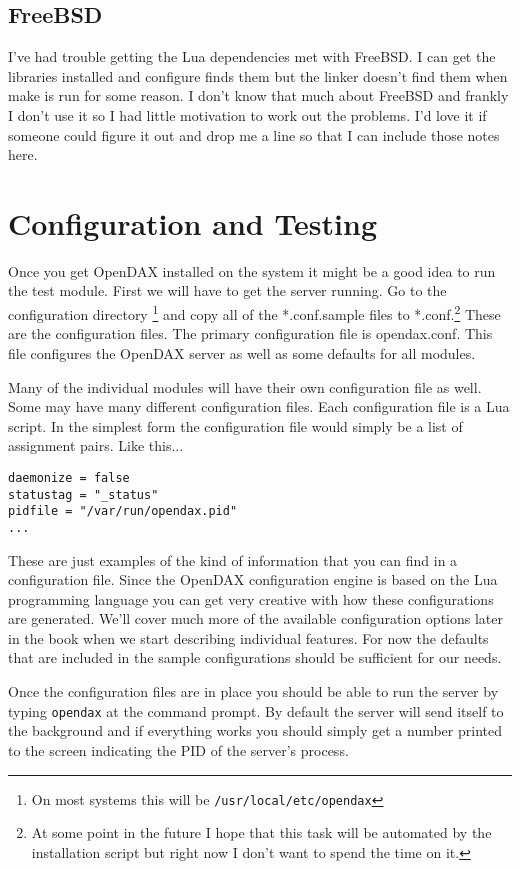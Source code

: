 \documentclass[10pt,letterpaper]{report}
\begin{document}
\subsection{FreeBSD}

I've had trouble getting the Lua dependencies met with FreeBSD. I can get the libraries installed and configure finds them but the linker doesn't find them when make is run for some reason. I don't know that much about FreeBSD and frankly I don't use it so I had little motivation to work out the problems. I'd love it if someone could figure it out and drop me a line so that I can include those notes here. 

\section{Configuration and Testing}

Once you get OpenDAX installed on the system it might be a good idea to run the test module.  First we will have to get the server running.  Go to the configuration directory \footnote{On most systems this will be \texttt{/usr/local/etc/opendax}} and copy all of the *.conf.sample files to *.conf.\footnote{At some point in the future I hope that this task will be automated by the installation script but right now I don't want to spend the time on it.}   These are the configuration files.  The primary configuration file is opendax.conf.  This file configures the OpenDAX server as well as some defaults for all modules.

Many of the individual modules will have their own configuration file as well.  Some may have many different configuration files.  Each configuration file is a Lua script.  In the simplest form the configuration file would simply be a list of assignment pairs. Like this...
\begin{verbatim}
daemonize = false
statustag = "_status"
pidfile = "/var/run/opendax.pid"
... 
\end{verbatim}

These are just examples of the kind of information that you can find in a configuration file.  Since the OpenDAX configuration engine is based on the Lua programming language you can get very creative with how these configurations are generated.  We'll cover much more of the available configuration options later in the book when we start describing individual features.  For now the defaults that are included in the sample configurations should be sufficient for our needs.

Once the configuration files are in place you should be able to run the server by typing \texttt{opendax} at the command prompt.  By default the server will send itself to the background and if everything works you should simply get a number printed to the screen indicating the PID of the server's process.
\end{document}
